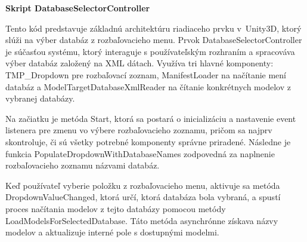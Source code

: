 {\large\textbf{Skript DatabaseSelectorController}}

Tento kód predstavuje základnú architektúru riadiaceho prvku v~Unity3D, ktorý slúži na výber databáz z rozbaľovacieho menu. Prvok DatabaseSelectorController je súčasťou systému, ktorý interaguje s používateľským rozhraním a spracováva výber databáz založený na XML dátach. Využíva tri hlavné komponenty: TMP\_Dropdown pre rozbaľovací zoznam, ManifestLoader na načítanie mení databáz a ModelTargetDatabaseXmlReader na čítanie konkrétnych modelov z vybranej databázy.

Na začiatku je metóda Start, ktorá sa postará o inicializáciu a nastavenie event listenera pre zmenu vo výbere rozbaľovacieho zoznamu, pričom sa najprv skontroluje, či sú všetky potrebné komponenty správne priradené. Následne je funkcia PopulateDropdownWithDatabaseNames zodpovedná za naplnenie rozbaľovacieho zoznamu názvami databáz.

Keď používateľ vyberie položku z rozbaľovacieho menu, aktivuje sa metóda DropdownValueChanged, ktorá určí, ktorá databáza bola vybraná, a spustí proces načítania modelov z tejto databázy pomocou metódy LoadModelsForSelectedDatabase. Táto metóda asynchrónne získava názvy modelov a aktualizuje interné pole s dostupnými modelmi.

